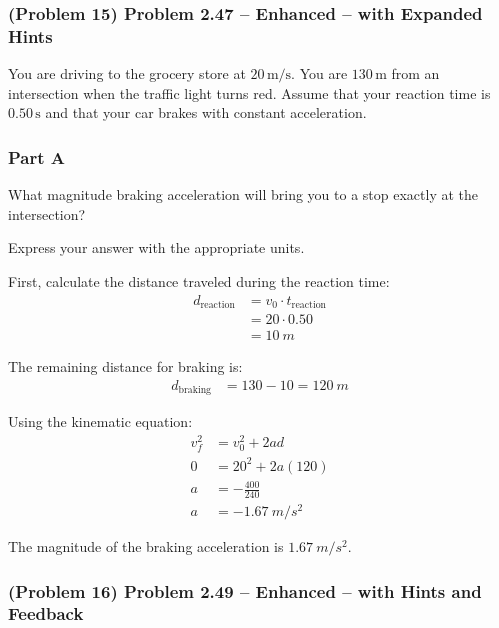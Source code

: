\newpage

\subsubsection{(Problem 15) Problem 2.47 -- Enhanced -- with Expanded Hints}

You are driving to the grocery store at \( 20 \, \mathrm{m/s} \). You are \( 130 \, \mathrm{m} \) from an intersection when the traffic light turns red. Assume that your reaction time is \( 0.50 \, \mathrm{s} \) and that your car brakes with constant acceleration.

\subsubsection{Part A}
What magnitude braking acceleration will bring you to a stop exactly at the intersection?

Express your answer with the appropriate units.

\begin{solution}
	First, calculate the distance traveled during the reaction time:
	\begin{align*}
		d_{\mathrm{reaction}} &= v_0 \cdot t_{\mathrm{reaction}} \\
		&= 20 \cdot 0.50 \\
		&= \SI{10}{m}
	\end{align*}

	The remaining distance for braking is:
	\begin{align*}
		d_{\mathrm{braking}} &= 130 - 10 = \SI{120}{m}
	\end{align*}

	Using the kinematic equation:
	\begin{align*}
		v_f^2 &= v_0^2 + 2ad \\
		0 &= 20^2 + 2a(120) \\
		a &= -\frac{400}{240} \\
		a &= -\SI{1.67}{m/s^2}
	\end{align*}

	The magnitude of the braking acceleration is \( \boxed{\SI{1.67}{m/s^2}} \).
\end{solution}

\newpage

\subsubsection{(Problem 16) Problem 2.49 -- Enhanced -- with Hints and Feedback}

